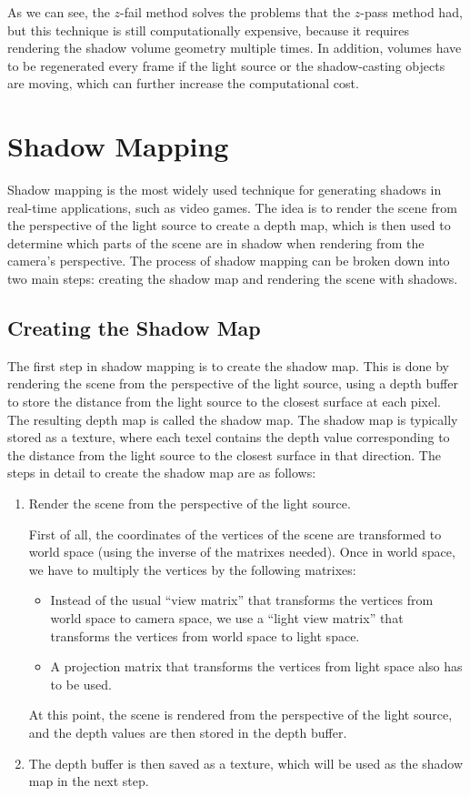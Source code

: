 As we can see, the $z$-fail method solves the problems that the $z$-pass method had, but this technique is still computationally expensive, because it requires rendering the shadow volume geometry multiple times. In addition, volumes have to be regenerated every frame if the light source or the shadow-casting objects are moving, which can further increase the computational cost.


\section{Shadow Mapping}

Shadow mapping is the most widely used technique for generating shadows in real-time applications, such as video games. The idea is to render the scene from the perspective of the light source to create a depth map, which is then used to determine which parts of the scene are in shadow when rendering from the camera's perspective. The process of shadow mapping can be broken down into two main steps: creating the shadow map and rendering the scene with shadows.

\subsection{Creating the Shadow Map}

The first step in shadow mapping is to create the shadow map. This is done by rendering the scene from the perspective of the light source, using a depth buffer to store the distance from the light source to the closest surface at each pixel. The resulting depth map is called the shadow map. The shadow map is typically stored as a texture, where each texel contains the depth value corresponding to the distance from the light source to the closest surface in that direction. The steps in detail to create the shadow map are as follows:
\begin{enumerate}
    \item Render the scene from the perspective of the light source.
    
    First of all, the coordinates of the vertices of the scene are transformed to world space (using the inverse of the matrixes needed). Once in world space, we have to multiply the vertices by the following matrixes:
    \begin{itemize}
        \item Instead of the usual ``view matrix'' that transforms the vertices from world space to camera space, we use a ``light view matrix'' that transforms the vertices from world space to light space.
        \item A projection matrix that transforms the vertices from light space also has to be used.
    \end{itemize}

    At this point, the scene is rendered from the perspective of the light source, and the depth values are then stored in the depth buffer.

    \item The depth buffer is then saved as a texture, which will be used as the shadow map in the next step.
\end{enumerate}

